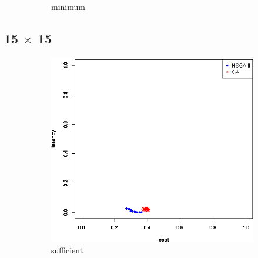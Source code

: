 \documentclass{llncs}
\begin{document}
\begin{figure}[H]
\begin{subfigure}[b]{0.3\textwidth}
		\caption{minimum}
	\end{subfigure}

	\caption{}\label{fig:condition}
\end{figure}

\subsection{15 $\times$ 15}
\begin{figure}[H]
	\centering
	\begin{subfigure}[b]{0.3\textwidth}
		\includegraphics[width=\textwidth]{pics/pop_50_gen_50_15_times_15_suff.png}
		\caption{sufficient}
	\end{subfigure}
	\begin{subfigure}[b]{0.3\textwidth}

\end{subfigure}
\end{figure}
\end{document}
